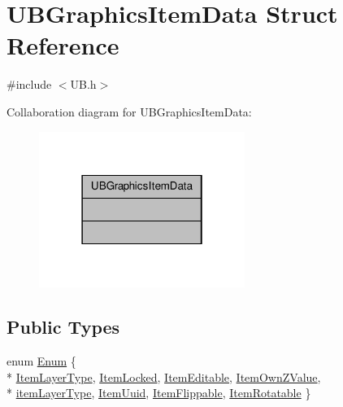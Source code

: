 \hypertarget{struct_u_b_graphics_item_data}{\section{U\-B\-Graphics\-Item\-Data Struct Reference}
\label{dc/dbe/struct_u_b_graphics_item_data}
}


{\ttfamily \#include $<$U\-B.\-h$>$}



Collaboration diagram for U\-B\-Graphics\-Item\-Data\-:
\nopagebreak
\begin{figure}[H]
\begin{center}
\leavevmode
\includegraphics[width=190pt]{db/dda/struct_u_b_graphics_item_data__coll__graph}
\end{center}
\end{figure}
\subsection*{Public Types}
\begin{DoxyCompactItemize}
\item 
enum \hyperlink{struct_u_b_graphics_item_data_a25580b2117f348914ccb50e97700864b}{Enum} \{ \\*
\hyperlink{struct_u_b_graphics_item_data_a25580b2117f348914ccb50e97700864ba2e41b0c7fe33a4d4ea2d3fa3be02ae15}{Item\-Layer\-Type}, 
\hyperlink{struct_u_b_graphics_item_data_a25580b2117f348914ccb50e97700864ba58a083455c298d786bec3d1af87ef1b5}{Item\-Locked}, 
\hyperlink{struct_u_b_graphics_item_data_a25580b2117f348914ccb50e97700864ba02b241a6418be241a25a9a4261575b9f}{Item\-Editable}, 
\hyperlink{struct_u_b_graphics_item_data_a25580b2117f348914ccb50e97700864bafd234c2c7d1e0807eaa42fbbe52319fb}{Item\-Own\-Z\-Value}, 
\\*
\hyperlink{struct_u_b_graphics_item_data_a25580b2117f348914ccb50e97700864bacbe7e8290ad84618c29310455744ee5b}{item\-Layer\-Type}, 
\hyperlink{struct_u_b_graphics_item_data_a25580b2117f348914ccb50e97700864ba23c3d8f02812e7cb8117e41294a6ff1d}{Item\-Uuid}, 
\hyperlink{struct_u_b_graphics_item_data_a25580b2117f348914ccb50e97700864baff7924ecdcd86c84d57179096119e1f5}{Item\-Flippable}, 
\hyperlink{struct_u_b_graphics_item_data_a25580b2117f348914ccb50e97700864ba84acb9a1295178936c6216cfbcdae8da}{Item\-Rotatable}
 \}
\end{DoxyCompactItemize}


